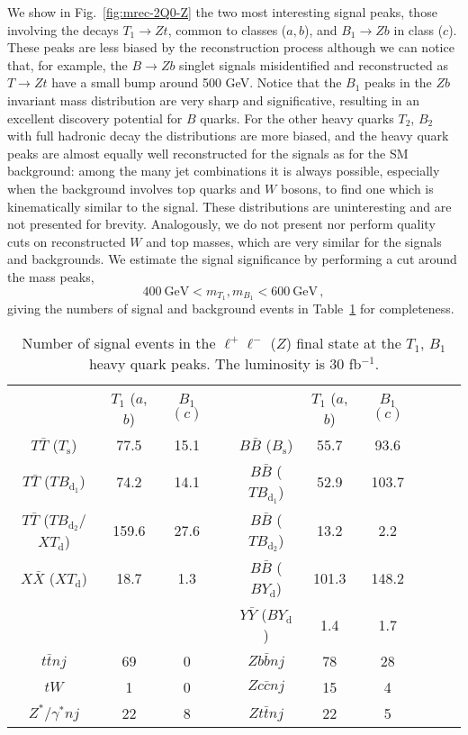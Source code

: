 \documentclass[12pt,a4paper]{article}
\newcommand{\TT}{T \bar T}
\newcommand{\BB}{B \bar B}
\newcommand{\XX}{X \bar X}
\newcommand{\YY}{Y \bar Y}
\newcommand{\Ts}{T_\text{s}}
\newcommand{\Bs}{B_\text{s}}
\newcommand{\TBd}{TB_{\text{d}_1}}
\newcommand{\TBD}{TB_{\text{d}_2}}
\newcommand{\XTd}{XT_\text{d}}
\newcommand{\BYd}{BY_\text{d}}
\begin{document}
We show in Fig.~\ref{fig:mrec-2Q0-Z} the two most interesting signal peaks, those involving the decays $T_1 \to Zt$, common to classes ($a,b$), and $B_1 \to Zb$ in class ($c$). These peaks are less biased by the reconstruction process although we can notice that, for example, the $B\to Zb$ singlet signals misidentified and reconstructed as $T \to Zt$ have a small bump around 500 GeV.
Notice that the $B_1$ peaks in the $Zb$ invariant mass distribution are very sharp and significative, resulting in an excellent discovery potential for $B$ quarks.
For the other heavy quarks $T_2$, $B_2$ with full hadronic decay the distributions are more biased, and the heavy quark peaks are almost equally well reconstructed for the signals as for the SM background: among the many jet combinations it is always possible,
especially when the background involves top quarks and $W$ bosons, to find one which is kinematically similar to the signal. These distributions are uninteresting and are not presented for brevity. Analogously, we do not present nor perform quality cuts on reconstructed $W$ and top masses, which are very similar for the signals and backgrounds.
We estimate the signal significance by performing a cut around the mass peaks,
\begin{equation}
400~\text{GeV} < m_{T_1},m_{B_1} < 600~\text{GeV} \,, 
\end{equation}
giving the numbers of signal and background events in Table~\ref{tab:nsnb-2Q0-Z-C2} for completeness.
%
\begin{table}[t]
\begin{center}
\begin{tabular}{cccccccccc}
 & $T_1$ ($a$,$b$) & $B_1$ $(c)$  & \quad & & $T_1$ ($a$,$b$) & $B_1$ $(c)$ \\[1mm]
$\TT$ ($\Ts$)   & 77.5  & 15.1   && $\BB$ ($\Bs$)  & 55.7   & 93.6  \\
$\TT$ ($\TBd$)  & 74.2  & 14.1   && $\BB$ ($\TBd$) & 52.9   & 103.7 \\
$\TT$ ($\TBD$/$\XTd$)  & 159.6 & 27.6   && $\BB$ ($\TBD$) & 13.2   & 2.2 \\
$\XX$ ($\XTd$)  & 18.7  & 1.3    && $\BB$ ($\BYd$) & 101.3  & 148.2 \\
                &       &        && $\YY$ ($\BYd$) & 1.4    & 1.7 \\
\hline
$t \bar t nj$   & 69    & 0      && $Zb\bar b nj$  & 78     & 28\\
$tW$            & 1     & 0      && $Zc \bar c nj$ & 15     & 4 \\
$Z^*/\gamma^*nj$& 22    & 8      && $Zt \bar t nj$ & 22     & 5 
\end{tabular}
\end{center}
\caption{Number of signal events in the $\ell^+ \ell^-$ ($Z$) final state at the $T_1$, $B_1$ heavy quark peaks. The luminosity is 30 fb$^{-1}$.}
\label{tab:nsnb-2Q0-Z-C2}
\end{table}
\end{document}
